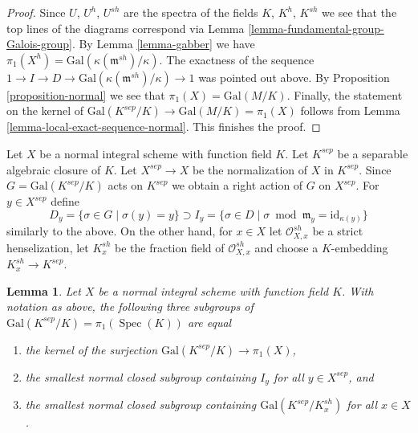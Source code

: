 \documentclass{stacks-project}
\theoremstyle{plain}
\newtheorem{lemma}[subsection]{Lemma}
\theoremstyle{definition}
\theoremstyle{remark}
\numberwithin{equation}{subsection}
\def\Spec{\mathop{\mathrm{Spec}}}
\begin{document}
\begin{proof}
\medskip\noindent
Since $U$, $U^h$, $U^{sh}$ are the spectra of the fields
$K$, $K^h$, $K^{sh}$ we see that the top lines of the diagrams
correspond via
Lemma \ref{lemma-fundamental-group-Galois-group}.
By Lemma \ref{lemma-gabber} we have
$\pi_1(X^h) = \text{Gal}(\kappa(\mathfrak m^{sh})/\kappa)$.
The exactness of the sequence
$1 \to I \to D \to \text{Gal}(\kappa(\mathfrak m^{sh})/\kappa) \to 1$
was pointed out above.
By Proposition \ref{proposition-normal}
we see that $\pi_1(X) = \text{Gal}(M/K)$.
Finally, the statement on the kernel of
$\text{Gal}(K^{sep}/K) \to \text{Gal}(M/K) = \pi_1(X)$
follows from Lemma \ref{lemma-local-exact-sequence-normal}.
This finishes the proof.
\end{proof}

\noindent
Let $X$ be a normal integral scheme with function field $K$.
Let $K^{sep}$ be a separable algebraic closure of $K$.
Let $X^{sep} \to X$ be the normalization of $X$ in $K^{sep}$.
Since $G = \text{Gal}(K^{sep}/K)$ acts on $K^{sep}$
we obtain a right action of $G$ on $X^{sep}$.
For $y \in X^{sep}$ define
$$
D_y = \{\sigma \in G \mid \sigma(y) = y\} \supset
I_y = \{\sigma \in D \mid \sigma \bmod \mathfrak m_y =
\text{id}_{\kappa(y)} \}
$$
similarly to the above. On the other hand, for $x \in X$
let $\mathcal{O}_{X, x}^{sh}$ be a strict henselization,
let $K_x^{sh}$ be the fraction field of $\mathcal{O}_{X, x}^{sh}$
and choose a $K$-embedding $K_x^{sh} \to K^{sep}$.

\begin{lemma}
\label{lemma-normal-pione-quotient-inertia}
Let $X$ be a normal integral scheme with function field $K$.
With notation as above, the following three subgroups of
$\text{Gal}(K^{sep}/K) = \pi_1(\Spec(K))$
are equal
\begin{enumerate}
\item the kernel of the surjection
$\text{Gal}(K^{sep}/K) \longrightarrow \pi_1(X)$,
\item the smallest normal closed subgroup containing $I_y$
for all $y \in X^{sep}$, and
\item the smallest normal closed subgroup containing
$\text{Gal}(K^{sep}/K_x^{sh})$ for all $x \in  X$.
\end{enumerate}
\end{lemma}
\end{document}
